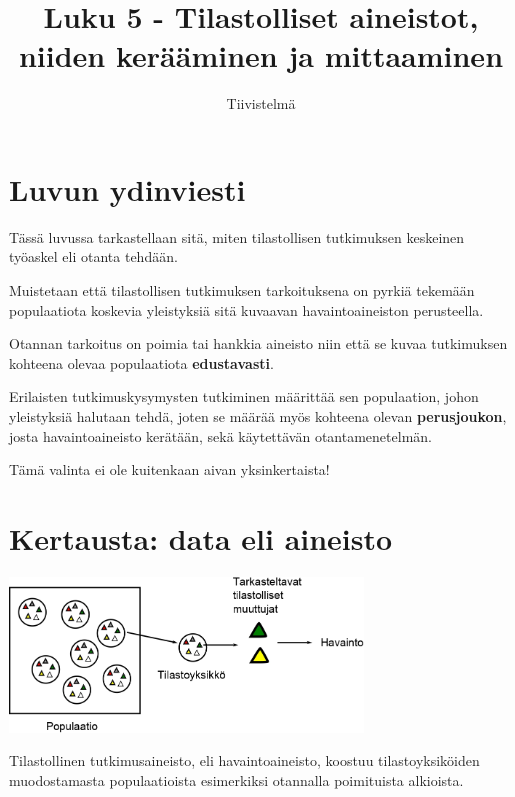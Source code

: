 \documentclass[
]{report}
\title{Luku 5 - Tilastolliset aineistot, niiden kerääminen ja
mittaaminen}
\subtitle{Tiivistelmä}
\author{}
\date{}
\begin{document}
\maketitle
\ifdefined\Shaded\renewenvironment{Shaded}{\begin{tcolorbox}[sharp corners, enhanced, breakable, frame hidden, interior hidden, boxrule=0pt, borderline west={3pt}{0pt}{shadecolor}]}{\end{tcolorbox}}\fi

\hypertarget{luvun-ydinviesti}{%
\section{Luvun ydinviesti}\label{luvun-ydinviesti}}

Tässä luvussa tarkastellaan sitä, miten tilastollisen tutkimuksen
keskeinen työaskel eli otanta tehdään.

Muistetaan että tilastollisen tutkimuksen tarkoituksena on pyrkiä
tekemään populaatiota koskevia yleistyksiä sitä kuvaavan
havaintoaineiston perusteella.

Otannan tarkoitus on poimia tai hankkia aineisto niin että se kuvaa
tutkimuksen kohteena olevaa populaatiota \textbf{edustavasti}.

Erilaisten tutkimuskysymysten tutkiminen määrittää sen populaation,
johon yleistyksiä halutaan tehdä, joten se määrää myös kohteena olevan
\textbf{perusjoukon}, josta havaintoaineisto kerätään, sekä käytettävän
otantamenetelmän.

Tämä valinta ei ole kuitenkaan aivan yksinkertaista!

\hypertarget{kertausta-data-eli-aineisto}{%
\section{Kertausta: data eli
aineisto}\label{kertausta-data-eli-aineisto}}

\includegraphics[width=3.69792in,height=\textheight]{populaatiostahavaintoon.jpg}

Tilastollinen tutkimusaineisto, eli havaintoaineisto, koostuu
tilastoyksiköiden muodostamasta populaatioista esimerkiksi otannalla
poimituista alkioista.
\end{document}
